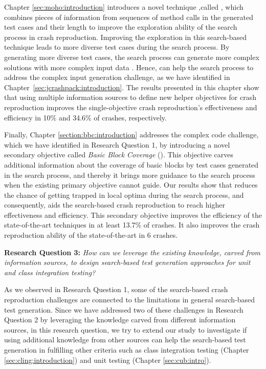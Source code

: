 Chapter \ref{sec:moho:introduction} introduces a novel technique ,called \moho, which combines pieces of information from sequences of method calls in the generated test cases and their length to improve the exploration ability of the search process in crash reproduction. Improving the exploration in this search-based technique leads to more diverse test cases during the search process. By generating more diverse test cases, the search process can generate more complex solutions with more complex input data \cite{jensen2004helper}. Hence, \moho can help the search process to address the complex input generation challenge, as we have identified in Chapter~\ref{sec:jcrashpack:introduction}. The results presented in this chapter show that using multiple information sources to define new helper objectives for crash reproduction improves the single-objective crash reproduction's effectiveness and efficiency in 10\% and 34.6\% of crashes, respectively.



Finally, Chapter \ref{section:bbc:introduction} addresses the complex code challenge, which we have identified in Research Question 1, by introducing a novel secondary objective called \textit{Basic Block Coverage} (\bbc). This objective carves additional information about the coverage of basic blocks by test cases generated in the search process, and thereby it brings more guidance to the search process when the existing primary objective cannot guide. Our results show that \bbc reduces the chance of getting trapped in local optima during the search process, and consequently, aids the search-based crash reproduction to reach higher effectiveness and efficiency. This secondary objective improves the efficiency of the state-of-the-art techniques in at least 13.7\% of crashes. It also improves the crash reproduction ability of the state-of-the-art in 6 crashes.


\textbf{Research Question 3: }\textit{How can we leverage the existing knowledge, carved from information sources, to design search-based test generation approaches for unit and class integration testing?}

As we observed in Research Question 1, some of the search-based crash reproduction challenges are connected to the limitations in general search-based test generation. Since we have addressed two of these challenges in Research Question 2 by leveraging the knowledge carved from different information sources, in this research question, we try to extend our study to investigate if using additional knowledge from other sources can help the search-based test generation in fulfilling other criteria such as class integration testing (Chapter \ref{sec:cling:introduction}) and unit testing (Chapter \ref{sec:cub:intro}).

